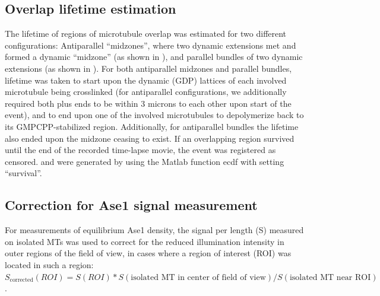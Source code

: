 \subsection{Overlap lifetime estimation}
The lifetime of regions of microtubule overlap was estimated for two different configurations: Antiparallel “midzones”, where two dynamic extensions met and formed a dynamic “midzone” (as shown in ), and parallel bundles of two dynamic extensions (as shown in ). For both antiparallel midzones and parallel bundles, lifetime was taken to start upon the dynamic (GDP) lattices of each involved microtubule being crosslinked (for antiparallel configurations, we additionally required both plus ends to be within 3 microns to each other upon start of the event), and to end upon one of the involved microtubules to depolymerize back to its GMPCPP-stabilized region. Additionally, for antiparallel bundles the lifetime also ended upon the midzone ceasing to exist. If an overlapping region survived until the end of the recorded time-lapse movie, the event was registered as censored.  and  were generated by using the Matlab function ecdf with setting “survival”.

\subsection{Correction for Ase1 signal measurement}
For measurements of equilibrium Ase1 density, the signal per length (S) measured on isolated MTs was used to correct for the reduced illumination intensity in outer regions of the field of view, in cases where a region of interest (ROI) was located in such a region: $S_{\textrm{corrected}}(ROI) = S(ROI) * S(\textrm{isolated MT in center of field of view}) / S(\textrm{isolated MT near ROI})$.

